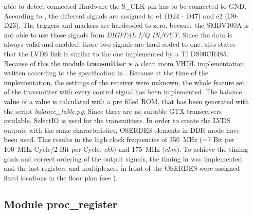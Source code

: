 \documentclass[11pt,technote,a4paper,onecolumn,dvips]{IEEEtran}
\newcommand{\signal}[1]{{\ttfamily #1}}
\newcommand{\module}[1]{{\ttfamily\bfseries #1}}
\newcommand{\clk}[1]{{\itshape\ttfamily #1}}
\begin{document}
able to detect connected Hardware the S\_CLK pin has to be connected to GND.
According to \cite[p. 10]{fsq_b17}, the different signals are assigned to
\signal{e1} (D24 - D47) and \signal{e2} (D0-D23). The triggers and markers are
hardcoded to zero, because the SMBV100A is not able to use those signals from
\emph{DIGITAL I/Q IN/OUT}. Since the data is always valid and enabled, those two
signals are hard coded to one. \cite[p. 10]{fsq_b17} also states that the LVDS
link is similar to the one implemented by a TI DS90CR485. Because of this the module
\module{transmitter} is a clean room VHDL implementation written according to
the specification in \cite{ds90cr485}. Because at the time of the implementation,
the settings of the receiver were unknown, the whole feature set of the
transmitter with every control signal has been implemented. The balance value
of a value is calculated with a pre filled ROM, that has been generated with
the script \emph{balance\_table.py}. Since there are no suitable GTX
transceivers \cite{gtx} available, SelectIO\cite[p. 270ff]{virtex5} is used
for the transmitters. In order to create the LVDS outputs with the same
characteristics, OSERDES \cite[p. 370ff]{virtex5} elements in
DDR mode have been used. This results in the high clock frequencies of
\SI{350}{MHz} (=7 Bit per \SI{100}{MHz} Cycle/2 Bit per Cycle, \clk{ckh}) and
\SI{175}{MHz} (\clk{ckm}). To achieve the timing goals and correct ordering
of the output signals, the timing in  was implemented and the
last registers and multiplexers in front of the OSERDES
\cite[p. 370ff]{virtex5} were assigned fixed locations in the floor plan
(see ).

\subsection{Module \module{proc\_register}}
\label{sec:register}
\end{document}
